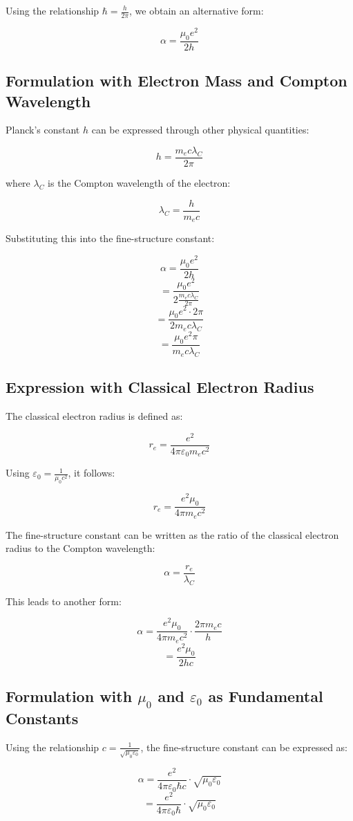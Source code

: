\documentclass{article}
\begin{document}
	Using the relationship $\hbar = \frac{h}{2\pi}$, we obtain an alternative form:
	
	$$\alpha = \frac{\mu_0e^2}{2h}$$
	
	\subsection{Formulation with Electron Mass and Compton Wavelength}
	Planck's constant $h$ can be expressed through other physical quantities:
	
	$$h = \frac{m_e c \lambda_C}{2\pi}$$
	
	where $\lambda_C$ is the Compton wavelength of the electron:
	
	$$\lambda_C = \frac{h}{m_e c}$$
	
	Substituting this into the fine-structure constant:
	
	$$\alpha = \frac{\mu_0e^2}{2h}$$
	$$= \frac{\mu_0e^2}{2\frac{m_e c \lambda_C}{2\pi}}$$
	$$= \frac{\mu_0e^2 \cdot 2\pi}{2m_e c \lambda_C}$$
	$$= \frac{\mu_0e^2\pi}{m_e c \lambda_C}$$
	
	\subsection{Expression with Classical Electron Radius}
	The classical electron radius is defined as:
	
	$$r_e = \frac{e^2}{4\pi\varepsilon_0 m_e c^2}$$
	
	Using $\varepsilon_0 = \frac{1}{\mu_0c^2}$, it follows:
	
	$$r_e = \frac{e^2\mu_0}{4\pi m_e c^2}$$
	
	The fine-structure constant can be written as the ratio of the classical electron radius to the Compton wavelength:
	
	$$\alpha = \frac{r_e}{\lambda_C}$$
	
	This leads to another form:
	
	$$\alpha = \frac{e^2\mu_0}{4\pi m_e c^2} \cdot \frac{2\pi m_e c}{h}$$
	$$= \frac{e^2\mu_0}{2hc}$$
	
	\subsection{Formulation with $\mu_0$ and $\varepsilon_0$ as Fundamental Constants}
	Using the relationship $c = \frac{1}{\sqrt{\mu_0\varepsilon_0}}$, the fine-structure constant can be expressed as:
	
	$$\alpha = \frac{e^2}{4\pi\varepsilon_0\hbar c} \cdot \sqrt{\mu_0\varepsilon_0}$$
	$$= \frac{e^2}{4\pi\varepsilon_0\hbar} \cdot \sqrt{\mu_0\varepsilon_0}$$
	
\end{document}
